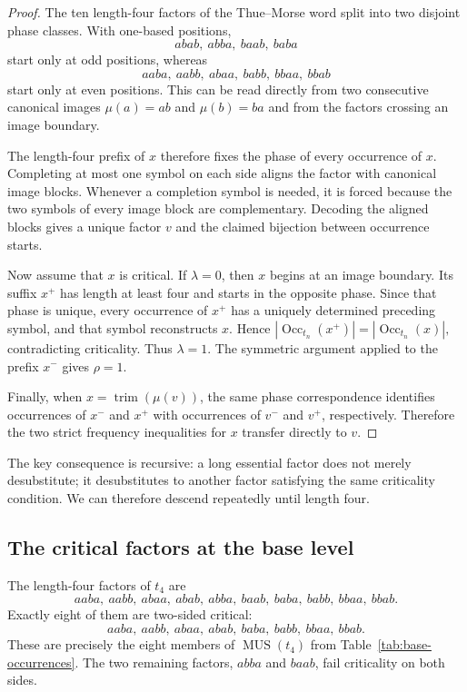 \documentclass[11pt,a4paper]{article}
\theoremstyle{definition}\newtheorem{definition}[theorem]{Definition}
\theoremstyle{remark}\newtheorem{remark}[theorem]{Remark}
\newcommand{\Occ}{\operatorname{Occ}}
\newcommand{\MUS}{\operatorname{MUS}}
\begin{document}
\begin{proof}
The ten length-four factors of the Thue--Morse word split into two disjoint phase classes.  With one-based positions,
\[
 abab,\ abba,\ baab,\ baba
\]
start only at odd positions, whereas
\[
 aaba,\ aabb,\ abaa,\ babb,\ bbaa,\ bbab
\]
start only at even positions.  This can be read directly from two consecutive canonical images $\mu(a)=ab$ and $\mu(b)=ba$ and from the factors crossing an image boundary.

The length-four prefix of $x$ therefore fixes the phase of every occurrence of $x$.  Completing at most one symbol on each side aligns the factor with canonical image blocks.  Whenever a completion symbol is needed, it is forced because the two symbols of every image block are complementary.  Decoding the aligned blocks gives a unique factor $v$ and the claimed bijection between occurrence starts.

Now assume that $x$ is critical.  If $\lambda=0$, then $x$ begins at an image boundary.  Its suffix $x^+$ has length at least four and starts in the opposite phase.  Since that phase is unique, every occurrence of $x^+$ has a uniquely determined preceding symbol, and that symbol reconstructs $x$.  Hence
$
 |\Occ_{t_n}(x^+)|=|\Occ_{t_n}(x)|,
$
contradicting criticality.  Thus $\lambda=1$.  The symmetric argument applied to the prefix $x^-$ gives $\rho=1$.

Finally, when $x=\operatorname{trim}(\mu(v))$, the same phase correspondence identifies occurrences of $x^-$ and $x^+$ with occurrences of $v^-$ and $v^+$, respectively.  Therefore the two strict frequency inequalities for $x$ transfer directly to $v$.
\end{proof}

The key consequence is recursive: a long essential factor does not merely desubstitute; it desubstitutes to another factor satisfying the same criticality condition.  We can therefore descend repeatedly until length four.

\subsection{The critical factors at the base level}
\label{subsec:critical-base}

The length-four factors of $t_4$ are
\[
 aaba,\ aabb,\ abaa,\ abab,\ abba,\ baab,\ baba,\ babb,\ bbaa,\ bbab.
\]
Exactly eight of them are two-sided critical:
\[
 aaba,\ aabb,\ abaa,\ abab,\ baba,\ babb,\ bbaa,\ bbab.
\]
These are precisely the eight members of $\MUS(t_4)$ from Table~\ref{tab:base-occurrences}.  The two remaining factors, $abba$ and $baab$, fail criticality on both sides.
\end{document}
